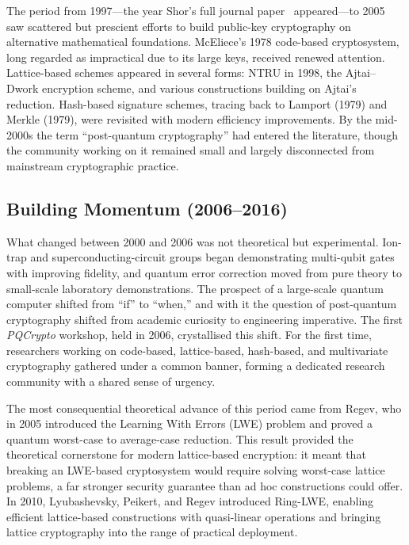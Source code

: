 The period from 1997---the year Shor's full journal paper~\cite{Shor1997} appeared---to 2005 saw scattered but prescient efforts to build public-key cryptography on alternative mathematical foundations.  McEliece's 1978 code-based cryptosystem, long regarded as impractical due to its large keys, received renewed attention.  Lattice-based schemes appeared in several forms: NTRU in 1998, the Ajtai--Dwork encryption scheme, and various constructions building on Ajtai's reduction.  Hash-based signature schemes, tracing back to Lamport (1979) and Merkle (1979), were revisited with modern efficiency improvements.  By the mid-2000s the term ``post-quantum cryptography'' had entered the literature, though the community working on it remained small and largely disconnected from mainstream cryptographic practice.

\subsection{Building Momentum (2006--2016)}

What changed between 2000 and 2006 was not theoretical but experimental.  Ion-trap and superconducting-circuit groups began demonstrating multi-qubit gates with improving fidelity, and quantum error correction moved from pure theory to small-scale laboratory demonstrations.  The prospect of a large-scale quantum computer shifted from ``if'' to ``when,'' and with it the question of post-quantum cryptography shifted from academic curiosity to engineering imperative.  The first \emph{PQCrypto} workshop, held in 2006, crystallised this shift.  For the first time, researchers working on code-based, lattice-based, hash-based, and multivariate cryptography gathered under a common banner, forming a dedicated research community with a shared sense of urgency.

The most consequential theoretical advance of this period came from Regev, who in 2005 introduced the Learning With Errors (LWE) problem and proved a quantum worst-case to average-case reduction.  This result provided the theoretical cornerstone for modern lattice-based encryption: it meant that breaking an LWE-based cryptosystem would require solving worst-case lattice problems, a far stronger security guarantee than ad hoc constructions could offer.  In 2010, Lyubashevsky, Peikert, and Regev introduced Ring-LWE, enabling efficient lattice-based constructions with quasi-linear operations and bringing lattice cryptography into the range of practical deployment.

